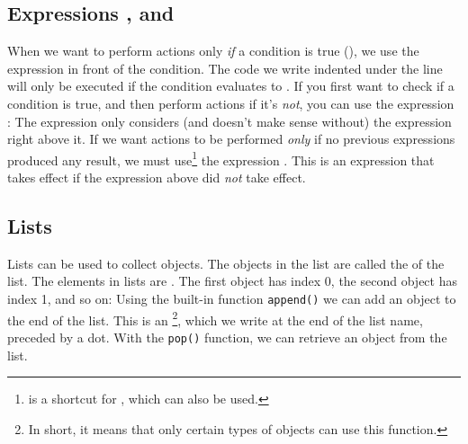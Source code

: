 \subsection{Expressions , and }
When we want to perform actions only \textsl{if} a condition is true (), we use the expression  in front of the condition. The code we write indented under the  line will only be executed if the condition evaluates to .
If you first want to check if a condition is true, and then perform actions if it's \textsl{not}, you can use the expression :
The expression  only considers (and doesn't make sense without) the  expression right above it. If we want actions to be performed \textsl{only} if no previous  expressions produced any result, we must use\footnote{ is a shortcut for , which can also be used.} the expression . This is an  expression that takes effect if the  expression above did \textsl{not} take effect.
\newpage

\subsection{Lists}
Lists can be used to collect objects. The objects in the list are called the  of the list.
The elements in lists are . The first object has index 0, the second object has index 1, and so on:
Using the built-in function \texttt{append()} we can add an object to the end of the list. This is an \footnote{In short, it means that only certain types of objects can use this function.}, which we write at the end of the list name, preceded by a dot.
\newpage
With the \texttt{pop()} function, we can retrieve an object from the list.

